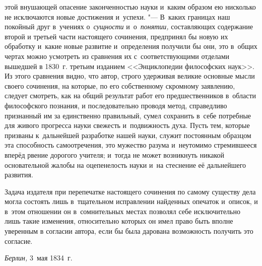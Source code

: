 этой внушающей опасение законченностью науки и~каким образом ею нисколько не
исключаются новые достижения и~успехи. "--- В~каких границах наш покойный друг
в~учениях о~{\em сущности} и~о~{\em понятии,} составляющих содержание второй и
третьей части настоящего сочинения, предпринял бы новую их обработку и~какие
новые развитие и~определения получили бы они, это в~общих чертах можно
усмотреть из сравнения их с~соответствующими отделами вышедшей в 1830~г.
третьим изданием <<Энциклопедии философских наук>>. Из этого сравнения видно,
что автор, строго удерживая великие основные мысли своего сочинения, на
которые, по его собственному скромному заявлению, следует смотреть, как на
общий результат работ его предшественников в~области философского познания, и
последовательно проводя метод, справедливо признанный им за единственно
правильный, сумел сохранить в~себе потребные для живого прогресса науки
свежесть и~подвижность духа. Пусть тем, которые призваны к~дальнейшей
разработке нашей науки, служит постоянным образцом эта способность
самоотречения, это мужество разума и~неутомимо стремившееся вперёд рвение
дорогого учителя; и~тогда не может возникнуть никакой основательной жалобы на
оцепенелость науки и~на стеснение её дальнейшего развития.

Задача издателя при перепечатке настоящего сочинения по самому существу дела
могла состоять лишь в~тщательном исправлении найденных опечаток и~описок, и
в~этом отношении он в~сомнительных местах позволял себе исключительно лишь
такие изменения, относительно которых он имел право быть вполне уверенным в
согласии автора, если бы была дарована возможность получить это согласие.

{\em Берлин,} 3~мая 1834~г.

